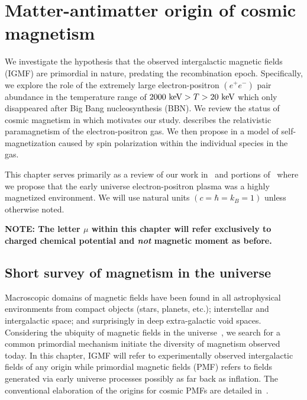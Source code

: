 \chapter{Matter-antimatter origin of cosmic magnetism}
\label{chap:cosmo}
\noindent We investigate the hypothesis that the observed intergalactic magnetic fields (IGMF) are primordial in nature, predating the recombination epoch. Specifically, we explore the role of the extremely large electron-positron $(e^{+}e^{-})$ pair abundance in the temperature range of $2000\text{ keV}>T>20\text{ keV}$ which only disappeared after Big Bang nucleosynthesis (BBN). We review the status of cosmic magnetism in  which motivates our study.  describes the relativistic paramagnetism of the electron-positron gas. We then propose in  a model of self-magnetization caused by spin polarization within the individual species in the gas.

This chapter serves primarily as a review of our work in~\cite{Steinmetz:2023} and portions of~\cite{Rafelski:2023emw} where we propose that the early universe electron-positron plasma was a highly magnetized environment. We will use natural units $(c=\hbar=k_{B}=1)$ unless otherwise noted.

\textbf{NOTE: The letter $\mu$ within this chapter will refer exclusively to charged chemical potential and \emph{not} magnetic moment as before.}

\section{Short survey of magnetism in the universe}
\label{sec:universe}
\noindent Macroscopic domains of magnetic fields have been found in all astrophysical environments from compact objects (stars, planets, etc.); interstellar and intergalactic space; and surprisingly in deep extra-galactic void spaces. Considering the ubiquity of magnetic fields in the universe~\citep{Giovannini:2017rbc,Giovannini:2003yn,Kronberg:1993vk}, we search for a common primordial mechanism initiate the diversity of magnetism observed today. In this chapter, IGMF will refer to experimentally observed intergalactic fields of any origin while primordial magnetic fields (PMF) refers to fields generated via early universe processes possibly as far back as inflation. The conventional elaboration of the origins for cosmic PMFs are detailed in~\citep{Gaensler:2004gk,Durrer:2013pga,AlvesBatista:2021sln}.

